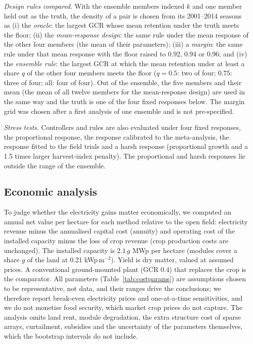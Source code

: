 \emph{Design rules compared.} With the ensemble members indexed $k$ and one member held out as the truth, the density of a pair is chosen from its 2001--2014 seasons as (i) the \emph{oracle}: the largest GCR whose mean retention under the truth meets the floor; (ii) the \emph{mean-response design}: the same rule under the mean response of the other four members (the mean of their parameters); (iii) a \emph{margin}: the same rule under that mean response with the floor raised to 0.92, 0.94 or 0.96; and (iv) the \emph{ensemble rule}: the largest GCR at which the mean retention under at least a share $q$ of the other four members meets the floor ($q=0.5$: two of four; $0.75$: three of four; all: four of four). Out of the ensemble, the five members and their mean (the mean of all twelve members for the mean-response design) are used in the same way and the truth is one of the four fixed responses below. The margin grid was chosen after a first analysis of one ensemble and is not pre-specified.

\emph{Stress tests.} Controllers and rules are also evaluated under four fixed responses, the proportional response, the response calibrated to the meta-analysis, the response fitted to the field trials and a harsh response (proportional growth and a 1.5 times larger harvest-index penalty). The proportional and harsh responses lie outside the range of the ensemble.

\subsection{Economic analysis}\label{sec:costmethods}
To judge whether the electricity gains matter economically, we computed an annual net value per hectare for each method relative to the open field: electricity revenue minus the annualised capital cost (annuity) and operating cost of the installed capacity minus the loss of crop revenue (crop production costs are unchanged). The installed capacity is $2.1\,g$ MWp per hectare (modules cover a share $g$ of the land at 0.21 kWp\,m$^{-2}$). Yield is dry matter, valued at assumed prices. A conventional ground-mounted plant (GCR 0.4) that replaces the crop is the comparator. All parameters (Table~\ref{tab:costparams}) are assumptions chosen to be representative, not data, and their ranges drive the conclusions; we therefore report break-even electricity prices and one-at-a-time sensitivities, and we do not monetise food security, which market crop prices do not capture. The analysis omits land rent, module degradation, the extra structure cost of sparse arrays, curtailment, subsidies and the uncertainty of the parameters themselves, which the bootstrap intervals do not include.

